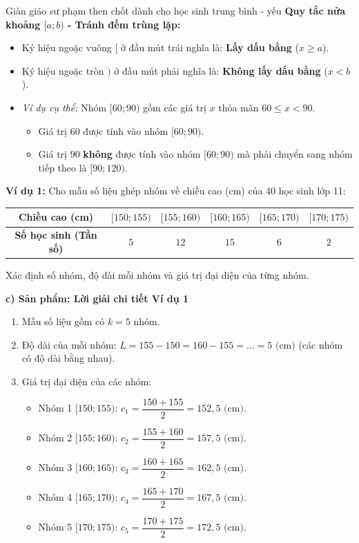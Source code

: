 \documentclass[12pt, a4paper]{article}
\begin{document}
\begin{scaffoldbox}{Giàn giáo sư phạm then chốt dành cho học sinh trung bình - yếu}
\textbf{Quy tắc nửa khoảng $[a; b)$ - Tránh đếm trùng lặp:}
\begin{itemize}[leftmargin=0.6cm]
    \item Ký hiệu ngoặc vuông $[$ ở đầu mút trái nghĩa là: \textbf{Lấy dấu bằng} ($x \ge a$).
    \item Ký hiệu ngoặc tròn $)$ ở đầu mút phải nghĩa là: \textbf{Không lấy dấu bằng} ($x < b$).
    \item \textit{Ví dụ cụ thể:} Nhóm $[60; 90)$ gồm các giá trị $x$ thỏa mãn $60 \le x < 90$.
    \begin{itemize}
        \item Giá trị $60$ được tính vào nhóm $[60; 90)$.
        \item Giá trị $90$ \textbf{không} được tính vào nhóm $[60; 90)$ mà phải chuyển sang nhóm tiếp theo là $[90; 120)$.
    \end{itemize}
\end{itemize}
\end{scaffoldbox}

\textbf{Ví dụ 1:} Cho mẫu số liệu ghép nhóm về chiều cao (cm) của 40 học sinh lớp 11:
\begin{center}
\small
\begin{tabular}{|c|c|c|c|c|c|}
\hline
\textbf{Chiều cao (cm)} & $[150; 155)$ & $[155; 160)$ & $[160; 165)$ & $[165; 170)$ & $[170; 175)$ \\ \hline
\textbf{Số học sinh (Tần số)} & $5$ & $12$ & $15$ & $6$ & $2$ \\ \hline
\end{tabular}
\end{center}
Xác định số nhóm, độ dài mỗi nhóm và giá trị đại diện của từng nhóm.

\noindent \textbf{c) Sản phẩm: Lời giải chi tiết Ví dụ 1}
\begin{enumerate}[leftmargin=0.6cm]
    \item Mẫu số liệu gồm có $k = 5$ nhóm.
    \item Độ dài của mỗi nhóm: $L = 155 - 150 = 160 - 155 = \dots = 5\text{ (cm)}$ (các nhóm có độ dài bằng nhau).
    \item Giá trị đại diện của các nhóm:
    \begin{itemize}
        \item Nhóm 1 $[150; 155)$: $c_1 = \dfrac{150 + 155}{2} = 152{,}5\text{ (cm)}$.
        \item Nhóm 2 $[155; 160)$: $c_2 = \dfrac{155 + 160}{2} = 157{,}5\text{ (cm)}$.
        \item Nhóm 3 $[160; 165)$: $c_3 = \dfrac{160 + 165}{2} = 162{,}5\text{ (cm)}$.
        \item Nhóm 4 $[165; 170)$: $c_4 = \dfrac{165 + 170}{2} = 167{,}5\text{ (cm)}$.
        \item Nhóm 5 $[170; 175)$: $c_5 = \dfrac{170 + 175}{2} = 172{,}5\text{ (cm)}$.
    \end{itemize}
\end{enumerate}
\end{document}
